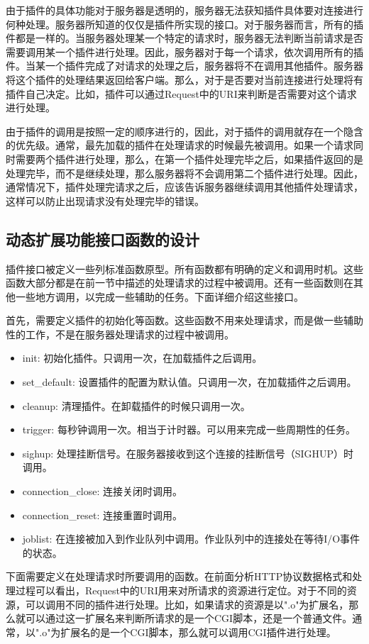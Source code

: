 \documentclass[twoside, xetex]{report}
\begin{document}
	由于插件的具体功能对于服务器是透明的，服务器无法获知插件具体要对连接进行何种处理。服务器所知道的仅仅是插件所实现的接口。对于服务器而言，所有的插件都是一样的。当服务器处理某一个特定的请求时，服务器无法判断当前请求是否需要调用某一个插件进行处理。因此，服务器对于每一个请求，依次调用所有的插件。当某一个插件完成了对请求的处理之后，服务器将不在调用其他插件。服务器将这个插件的处理结果返回给客户端。那么，对于是否要对当前连接进行处理将有插件自己决定。比如，插件可以通过Request中的URI来判断是否需要对这个请求进行处理。
	
	由于插件的调用是按照一定的顺序进行的，因此，对于插件的调用就存在一个隐含的优先级。通常，最先加载的插件在处理请求的时候最先被调用。如果一个请求同时需要两个插件进行处理，那么，在第一个插件处理完毕之后，如果插件返回的是处理完毕，而不是继续处理，那么服务器将不会调用第二个插件进行处理。因此，通常情况下，插件处理完请求之后，应该告诉服务器继续调用其他插件处理请求，这样可以防止出现请求没有处理完毕的错误。
	
\subsection{动态扩展功能接口函数的设计}
	插件接口被定义一些列标准函数原型。所有函数都有明确的定义和调用时机。这些函数大部分都是在前一节中描述的处理请求的过程中被调用。还有一些函数则在其他一些地方调用，以完成一些辅助的任务。下面详细介绍这些接口。
	
	首先，需要定义插件的初始化等函数。这些函数不用来处理请求，而是做一些辅助性的工作，不是在服务器处理请求的过程中被调用。
	\begin{itemize}
		\item init: 初始化插件。只调用一次，在加载插件之后调用。
		\item set\_default: 设置插件的配置为默认值。只调用一次，在加载插件之后调用。
		\item cleanup: 清理插件。在卸载插件的时候只调用一次。
		\item trigger: 每秒钟调用一次。相当于计时器。可以用来完成一些周期性的任务。
		\item sighup: 处理挂断信号。在服务器接收到这个连接的挂断信号（SIGHUP）时调用。
		\item connection\_close: 连接关闭时调用。
		\item connection\_reset: 连接重置时调用。
		\item joblist: 在连接被加入到作业队列中调用。作业队列中的连接处在等待I/O事件的状态。
	\end{itemize}
	
	下面需要定义在处理请求时所要调用的函数。在前面分析HTTP协议数据格式和处理过程可以看出，Request中的URI用来对所请求的资源进行定位。对于不同的资源，可以调用不同的插件进行处理。比如，如果请求的资源是以".o"为扩展名，那么就可以通过这一扩展名来判断所请求的是一个CGI脚本，还是一个普通文件。通常，以".o"为扩展名的是一个CGI脚本，那么就可以调用CGI插件进行处理。
	
\end{document}
